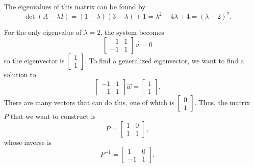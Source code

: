 \documentclass{ximera}
\begin{document}
\begin{exampleSol}
    The eigenvalues of this matrix can be found by
    \[ 
        \det(A - \lambda I) = (1-\lambda)(3-\lambda) + 1 = \lambda^2 - 4\lambda + 4 = (\lambda - 2)^2. 
    \]
    
    For the only eigenvalue of $\lambda = 2$, the system becomes
    \[ 
        \begin{bmatrix} 
            -1 & 1 \\ 
            -1 & 1 
        \end{bmatrix} 
        \vec{v} = 0
    \] 
    so the eigenvector is $\begin{bmatrix} 1 \\ 1 \end{bmatrix}$. To find a generalized eigenvector, we want to find a solution to
    \[ 
        \begin{bmatrix} 
            -1 & 1 \\ 
            -1 & 1 
        \end{bmatrix} 
        \vec{w} = 
        \begin{bmatrix} 
            1 \\ 
            1 
        \end{bmatrix}.
    \] 
    There are many vectors that can do this, one of which is $\begin{bmatrix} 0 \\ 1 \end{bmatrix}$. Thus, the matrix $P$ that we want to construct is 
    \[ 
        P = 
        \begin{bmatrix} 
            1 & 0 \\ 
            1 & 1 
        \end{bmatrix},
    \] 
    whose inverse is
    \[ 
        P^{-1} = 
        \begin{bmatrix} 
            1 & 0 \\ 
            -1 & 1 
        \end{bmatrix}.
    \]
    

\end{exampleSol}
\end{document}

